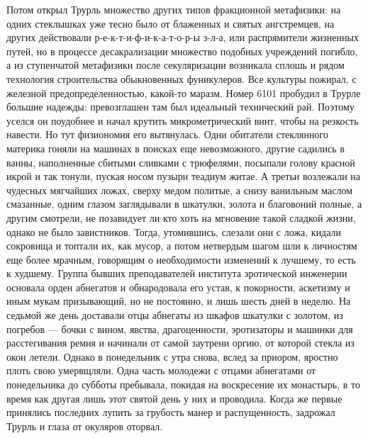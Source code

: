 Потом открыл Трурль множество других типов фракционной
метафизики: на одних стеклышках уже тесно было от блаженных
и святых ангстремцев, на других действовали
р-е-к-т-и-ф-и-к-а-т-о-р-ы з-л-а, или распрямители жизненных
путей, но в процессе десакрализации множество подобных
учреждений погибло, а из ступенчатой метафизики после
секуляризации возникала сплошь и рядом технология
строительства обыкновенных фуникулеров. Все культуры
пожирал, с железной предопределенностью, какой-то маразм.
Номер 6101 пробудил в Трурле большие надежды: превозглашен
там был идеальный технический рай. Поэтому уселся он
поудобнее и начал крутить микрометрический винт, чтобы на
резкость навести. Но тут физиономия его вытянулась. Одни
обитатели стеклянного материка гоняли на машинах в поисках
еще невозможного, другие садились в ванны, наполненные
сбитыми сливками с трюфелями, посыпали голову красной икрой
и так тонули, пуская носом пузыри теадиум житае. А третьи
возлежали на чудесных мягчайших ложах, сверху медом политые,
а снизу ванильным маслом смазанные, одним глазом заглядывали
в шкатулки, золота и благовоний полные, а другим смотрели,
не позавидует ли кто хоть на мгновение такой сладкой жизни,
однако не было завистников. Тогда, утомившись, слезали они с
ложа, кидали сокровища и топтали их, как мусор, а потом
нетвердым шагом шли к личностям еще более мрачным, говорящим
о необходимости изменений к лучшему, то есть к худшему.
Группа бывших преподавателей института эротической инженерии
основала орден абнегатов и обнародовала его устав, к
покорности, аскетизму и иным мукам призывающий, но не
постоянно, и лишь шесть дней в неделю. На седьмой же день
доставали отцы абнегаты из шкафов шкатулки с золотом, из
погребов --- бочки с вином, явства, драгоценности, эротизаторы
и машинки для расстегивания ремня и начинали от самой
заутрени оргию, от которой стекла из окон летели. Однако в
понедельник с утра снова, вслед за приором, яростно плоть
свою умервщляли. Одна часть молодежи с отцами абнегатами от
понедельника до субботы пребывала, покидая на воскресение их
монастырь, в то время как другая лишь этот святой день у них
и проводила. Когда же первые принялись последних лупить за
грубость манер и распущенность, задрожал Трурль и глаза от
окуляров оторвал.

